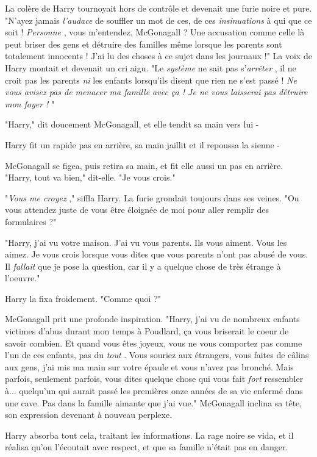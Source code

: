 La colère de Harry tournoyait hors de contrôle et devenait une furie noire et pure. "N'ayez jamais \emph{l'audace}  de souffler un mot de ces, de ces \emph{insinuations}  à qui que ce soit ! \emph{Personne} , vous m'entendez, McGonagall ? Une accusation comme celle là peut briser des gens et détruire des familles même lorsque les parents sont totalement innocents ! J'ai lu des choses à ce sujet dans les journaux !" La voix de Harry montait et devenait un cri aigu. "Le \emph{système}  ne sait pas s'\emph{arrêter} , il ne croit pas les parents \emph{ni}  les enfants lorsqu'ils disent que rien ne s'est passé ! \emph{Ne vous avisez pas de menacer ma famille avec ça ! Je ne vous laisserai pas détruire mon foyer !} "

"Harry," dit doucement McGonagall, et elle tendit sa main vers lui -

Harry fit un rapide pas en arrière, sa main jaillit et il repoussa la sienne -

McGonagall se figea, puis retira sa main, et fit elle aussi un pas en arrière. "Harry, tout va bien," dit-elle. "Je vous crois."

"\emph{Vous me croyez} ," siffla Harry. La furie grondait toujours dans ses veines. "Ou vous attendez juste de vous être éloignée de moi pour aller remplir des formulaires ?"

"Harry, j'ai vu votre maison. J'ai vu vous parents. Ils vous aiment. Vous les aimez. Je vous crois lorsque vous dites que vous parents n'ont pas abusé de vous. Il \emph{fallait}  que je pose la question, car il y a quelque chose de très étrange à l'oeuvre."

Harry la fixa froidement. "Comme quoi ?"

McGonagall prit une profonde inspiration. "Harry, j'ai vu de nombreux enfants victimes d'abus durant mon temps à Poudlard, ça vous briserait le coeur de savoir combien. Et quand vous êtes joyeux, vous ne vous comportez pas comme l'un de ces enfants, pas du \emph{tout} . Vous souriez aux étrangers, vous faites de câlins aux gens, j'ai mis ma main sur votre épaule et vous n'avez pas bronché. Mais parfois, seulement parfois, vous dites quelque chose qui vous fait \emph{fort } ressembler à... quelqu'un qui aurait passé les premières onze années de sa vie enfermé dans une cave. Pas dans la famille aimante que j'ai vue." McGonagall inclina sa tête, son expression devenant à nouveau perplexe.

Harry absorba tout cela, traitant les informations. La rage noire se vida, et il réalisa qu'on l'écoutait avec respect, et que sa famille n'était pas en danger.

